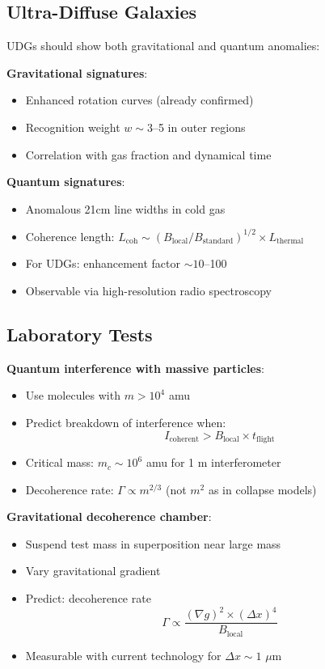 \documentclass[twocolumn,prd,amsmath,amssymb,aps,superscriptaddress,nofootinbib]{revtex4-2}
\begin{document}
\subsection{Ultra-Diffuse Galaxies}

UDGs should show both gravitational and quantum anomalies:

\textbf{Gravitational signatures}:
\begin{itemize}
\item Enhanced rotation curves (already confirmed)
\item Recognition weight $w \sim 3$--5 in outer regions
\item Correlation with gas fraction and dynamical time
\end{itemize}

\textbf{Quantum signatures}:
\begin{itemize}
\item Anomalous 21cm line widths in cold gas
\item Coherence length: $L_{\text{coh}} \sim (B_{\text{local}}/B_{\text{standard}})^{1/2} \times L_{\text{thermal}}$
\item For UDGs: enhancement factor $\sim 10$--100
\item Observable via high-resolution radio spectroscopy
\end{itemize}

\subsection{Laboratory Tests}

\textbf{Quantum interference with massive particles}:
\begin{itemize}
\item Use molecules with $m > 10^4$ amu
\item Predict breakdown of interference when:
\begin{equation}
I_{\text{coherent}} > B_{\text{local}} \times t_{\text{flight}}
\end{equation}
\item Critical mass: $m_c \sim 10^6$ amu for 1 m interferometer
\item Decoherence rate: $\Gamma \propto m^{2/3}$ (not $m^2$ as in collapse models)
\end{itemize}

\textbf{Gravitational decoherence chamber}:
\begin{itemize}
\item Suspend test mass in superposition near large mass
\item Vary gravitational gradient
\item Predict: decoherence rate 
\begin{equation}
\Gamma \propto \frac{(\nabla g)^2 \times (\Delta x)^4}{B_{\text{local}}}
\end{equation}
\item Measurable with current technology for $\Delta x \sim 1$ $\mu$m
\end{itemize}
\end{document}
